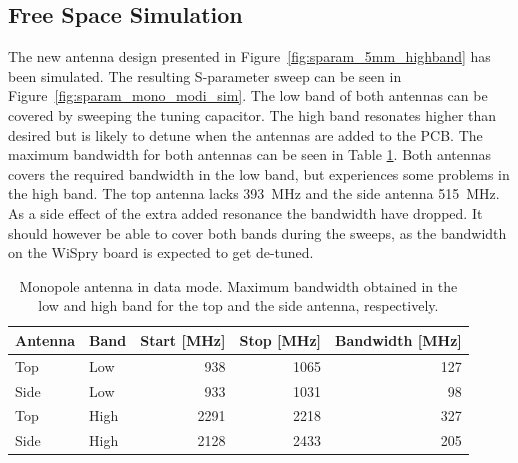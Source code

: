 \FloatBarrier
\subsection{Free Space Simulation}
\label{sec:highbandsimulations}
The new antenna design presented in Figure~\ref{fig:sparam_5mm_highband} has been simulated. The resulting S-parameter sweep can be seen in Figure~\ref{fig:sparam_mono_modi_sim}. The low band of both antennas can be covered by sweeping the tuning capacitor. The high band resonates higher than desired but is likely to detune when the antennas are added to the PCB. The maximum bandwidth for both antennas can be seen in Table \ref{tab:bw_mono_modi_fs}. Both antennas covers the required bandwidth in the low band, but experiences some problems in the high band. The top antenna lacks \SI{393}{MHz} and the side antenna \SI{515}{MHz}. As a side effect of the extra added resonance the bandwidth have dropped. It should however be able to cover both bands during the sweeps, as the bandwidth on the WiSpry board is expected to get de-tuned.  

\begin{table}[htbp]
  \centering
  \begin{tabular}{|l|l|r|r|r|}
    \hline
    Antenna & Band & Start [MHz] & Stop [MHz] & Bandwidth [MHz] \\
    \hline
    Top     & Low  &  938  & 1065  & 127 \\
    Side    & Low  &  933  & 1031  & 98  \\
    \hline
    Top     & High &  2291 &  2218  & 327 \\
    Side    & High & 2128 &  2433 & 205 \\
    \hline
  \end{tabular}
  \caption{Monopole antenna in data mode. Maximum bandwidth obtained in the low and high band for the top and the side antenna, respectively.}    
  \label{tab:bw_mono_modi_fs}
\end{table}


